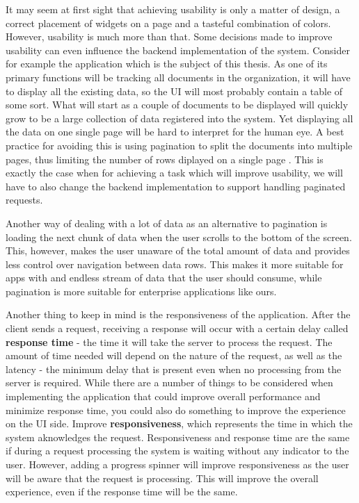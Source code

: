It may seem at first sight that achieving usability is only a matter of design, a correct placement of widgets on a page and a tasteful combination of colors. However, usability is much more than that. Some decisions made to improve usability can even influence the backend implementation of the system. Consider for example the application which is the subject of this thesis. As one of its primary functions will be tracking all documents in the organization, it will have to display all the existing data, so the UI will most probably contain a table of some sort. What will start as a couple of documents to be displayed will quickly grow to be a large collection of data registered into the system. Yet displaying all the data on one single page will be hard to interpret for the human eye. A best practice for avoiding this is using pagination to split the documents into multiple pages, thus limiting the number of rows diplayed on a single page \cite{modernEnterpriseUiDesign}. This is exactly the case when for achieving a task which will improve usability, we will have to also change the backend implementation to support handling paginated requests.

Another way of dealing with a lot of data as an alternative to pagination is loading the next chunk of data when the user scrolls to the bottom of the screen. This, however, makes the user unaware of the total amount of data and provides less control over navigation between data rows. This makes it more suitable for apps with and endless stream of data that the user should consume, while pagination is more suitable for enterprise applications like ours.

Another thing to keep in mind is the responsiveness of the application. After the client sends a request, receiving a response will occur with a certain delay called \textbf{response time} - the time it will take the server to process the request. The amount of time needed will depend on the nature of the request, as well as the latency - the minimum delay that is present even when no processing from the server is required. While there are a number of things to be considered when implementing the application that could improve overall performance and minimize response time, you could also do something to improve the experience on the UI side. Improve \textbf{responsiveness}, which represents the time in which the system aknowledges the request. Responsiveness and response time are the same if during a request processing the system is waiting without any indicator to the user. However, adding a progress spinner will improve responsiveness as the user will be aware that the request is processing. This will improve the overall experience, even if the response time will be the same.




